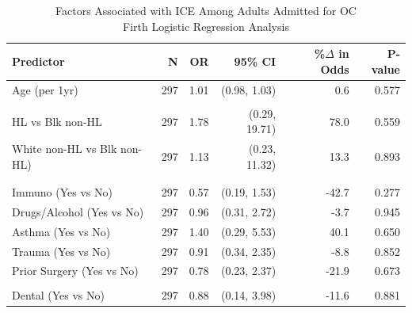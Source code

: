 \documentclass[
]{article}
\begin{document}
\begin{table}[t]
\caption*{
{\fontsize{20}{25}\selectfont  Factors Associated with ICE Among Adults Admitted for OC\small } \\ 
{\fontsize{14}{17}\selectfont  Firth Logistic Regression Analysis\small }
} 
\begin{tabular*}{0.85\linewidth}{@{\extracolsep{\fill}}lrrrrr}
\toprule
{\bfseries Predictor} & N & OR & 95\% CI & \%\ensuremath{\Delta} in Odds & P-value \\ 
\midrule\addlinespace[2.5pt]
Age (per 1yr) & 297 & 1.01 & (0.98, 1.03) & 0.6 & 0.577 \\ 
{\cellcolor[HTML]{FFF3CD}{Sex (Male vs Female)}} & {\cellcolor[HTML]{FFF3CD}{297}} & {\cellcolor[HTML]{FFF3CD}{0.43}} & {\cellcolor[HTML]{FFF3CD}{(0.20, 0.90)}} & {\cellcolor[HTML]{FFF3CD}{-57.2}} & {\cellcolor[HTML]{FFF3CD}{0.026}} \\ 
HL vs Blk non-HL & 297 & 1.78 & (0.29, 19.71) & 78.0 & 0.559 \\ 
White non-HL vs Blk non-HL) & 297 & 1.13 & (0.23, 11.32) & 13.3 & 0.893 \\ 
{\cellcolor[HTML]{FFF3CD}{Sinusitis (Yes vs No)}} & {\cellcolor[HTML]{FFF3CD}{297}} & {\cellcolor[HTML]{FFF3CD}{0.31}} & {\cellcolor[HTML]{FFF3CD}{(0.13, 0.67)}} & {\cellcolor[HTML]{FFF3CD}{-69.1}} & {\cellcolor[HTML]{FFF3CD}{0.003}} \\ 
{\cellcolor[HTML]{FFF3CD}{Diabetes (Yes vs No)}} & {\cellcolor[HTML]{FFF3CD}{297}} & {\cellcolor[HTML]{FFF3CD}{0.30}} & {\cellcolor[HTML]{FFF3CD}{(0.09, 0.81)}} & {\cellcolor[HTML]{FFF3CD}{-70.4}} & {\cellcolor[HTML]{FFF3CD}{0.016}} \\ 
Immuno (Yes vs No) & 297 & 0.57 & (0.19, 1.53) & -42.7 & 0.277 \\ 
Drugs/Alcohol (Yes vs No) & 297 & 0.96 & (0.31, 2.72) & -3.7 & 0.945 \\ 
Asthma (Yes vs No) & 297 & 1.40 & (0.29, 5.53) & 40.1 & 0.650 \\ 
Trauma (Yes vs No) & 297 & 0.91 & (0.34, 2.35) & -8.8 & 0.852 \\ 
Prior Surgery (Yes vs No) & 297 & 0.78 & (0.23, 2.37) & -21.9 & 0.673 \\ 
{\cellcolor[HTML]{FFF3CD}{Surgery in Admission (Yes vs No)}} & {\cellcolor[HTML]{FFF3CD}{297}} & {\cellcolor[HTML]{FFF3CD}{5.65}} & {\cellcolor[HTML]{FFF3CD}{(2.66, 12.99)}} & {\cellcolor[HTML]{FFF3CD}{465.1}} & {\cellcolor[HTML]{FFF3CD}{<0.001}} \\ 
Dental (Yes vs No) & 297 & 0.88 & (0.14, 3.98) & -11.6 & 0.881 \\ 

\end{tabular*}
\end{table}
\end{document}
